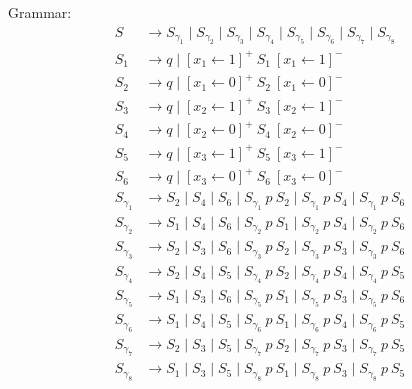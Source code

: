 Grammar:
\begin{align*}
S & \to S_{\gamma_1} \mid S_{\gamma_2} \mid S_{\gamma_3} \mid S_{\gamma_4} \mid S_{\gamma_5} \mid S_{\gamma_6} \mid S_{\gamma_7} \mid S_{\gamma_8}\\
S_1 & \to q  
      \mid [x_1 \leftarrow 1]^+ \ S_1 \ [x_1 \leftarrow 1]^- \\ 
S_2 & \to q  
      \mid [x_1 \leftarrow 0]^+ \ S_2 \ [x_1 \leftarrow 0]^- \\ 
S_3 & \to q  
      \mid [x_2 \leftarrow 1]^+ \ S_3 \ [x_2 \leftarrow 1]^- \\ 
S_4 & \to q 
      \mid [x_2 \leftarrow 0]^+ \ S_4 \ [x_2 \leftarrow 0]^- \\ 
S_5 & \to q
      \mid [x_3 \leftarrow 1]^+ \ S_5 \ [x_3 \leftarrow 1]^- \\ 
S_6 & \to q
      \mid [x_3 \leftarrow 0]^+ \ S_6 \ [x_3 \leftarrow 0]^- \\ 
S_{\gamma_1} & \to S_2 \mid S_4 \mid S_6 \mid S_{\gamma_1} \ p \ S_2 \mid S_{\gamma_1} \ p \ S_4 \mid S_{\gamma_1} \ p \ S_6\\
S_{\gamma_2} & \to S_1 \mid S_4 \mid S_6 \mid S_{\gamma_2} \ p \ S_1 \mid S_{\gamma_2} \ p \ S_4 \mid S_{\gamma_2} \ p \ S_6\\
S_{\gamma_3} & \to S_2 \mid S_3 \mid S_6 \mid S_{\gamma_3} \ p \ S_2 \mid S_{\gamma_3} \ p \ S_3 \mid S_{\gamma_3} \ p \ S_6\\
S_{\gamma_4} & \to S_2 \mid S_4 \mid S_5 \mid S_{\gamma_4} \ p \ S_2 \mid S_{\gamma_4} \ p \ S_4 \mid S_{\gamma_4} \ p \ S_5\\
S_{\gamma_5} & \to S_1 \mid S_3 \mid S_6 \mid S_{\gamma_5} \ p \ S_1 \mid S_{\gamma_5} \ p \ S_3 \mid S_{\gamma_5} \ p \ S_6\\
S_{\gamma_6} & \to S_1 \mid S_4 \mid S_5 \mid S_{\gamma_6} \ p \ S_1 \mid S_{\gamma_6} \ p \ S_4 \mid S_{\gamma_6} \ p \ S_5\\
S_{\gamma_7} & \to S_2 \mid S_3 \mid S_5 \mid S_{\gamma_7} \ p \ S_2 \mid S_{\gamma_7} \ p \ S_3 \mid S_{\gamma_7} \ p \ S_5\\
S_{\gamma_8} & \to S_1 \mid S_3 \mid S_5 \mid S_{\gamma_8} \ p \ S_1 \mid S_{\gamma_8} \ p \ S_3 \mid S_{\gamma_8} \ p \ S_5\\
\end{align*}



